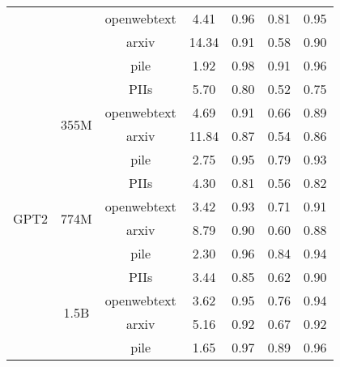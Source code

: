 \begin{table}[ht]
{\begin{tabular}{ccccccc}
\multicolumn{1}{c|}{}                        & \multicolumn{1}{c|}{}                      & openwebtext              & 4.41    & 0.96    & 0.81    & 0.95     \\
\multicolumn{1}{c|}{}                        & \multicolumn{1}{c|}{}                      & arxiv                    & 14.34   & 0.91    & 0.58    & 0.90     \\
\multicolumn{1}{c|}{}                        & \multicolumn{1}{c|}{}                      & pile                     & 1.92    & 0.98    & 0.91    & 0.96     \\ \hline
\multicolumn{1}{c|}{\multirow{12}{*}{GPT2}}  & \multicolumn{1}{c|}{\multirow{4}{*}{355M}} & PIIs                     & 5.70    & 0.80    & 0.52    & 0.75     \\
\multicolumn{1}{c|}{}                        & \multicolumn{1}{c|}{}                      & openwebtext              & 4.69    & 0.91    & 0.66    & 0.89     \\
\multicolumn{1}{c|}{}                        & \multicolumn{1}{c|}{}                      & arxiv                    & 11.84   & 0.87    & 0.54    & 0.86     \\
\multicolumn{1}{c|}{}                        & \multicolumn{1}{c|}{}                      & pile                     & 2.75    & 0.95    & 0.79    & 0.93     \\ \cline{2-7} 
\multicolumn{1}{c|}{}                        & \multicolumn{1}{c|}{\multirow{4}{*}{774M}} & PIIs                     & 4.30    & 0.81    & 0.56    & 0.82     \\
\multicolumn{1}{c|}{}                        & \multicolumn{1}{c|}{}                      & openwebtext              & 3.42    & 0.93    & 0.71    & 0.91     \\
\multicolumn{1}{c|}{}                        & \multicolumn{1}{c|}{}                      & arxiv                    & 8.79    & 0.90    & 0.60    & 0.88     \\
\multicolumn{1}{c|}{}                        & \multicolumn{1}{c|}{}                      & pile                     & 2.30    & 0.96    & 0.84    & 0.94     \\ \cline{2-7} 
\multicolumn{1}{c|}{}                        & \multicolumn{1}{c|}{\multirow{4}{*}{1.5B}} & PIIs                     & 3.44    & 0.85    & 0.62    & 0.90     \\
\multicolumn{1}{c|}{}                        & \multicolumn{1}{c|}{}                      & openwebtext              & 3.62    & 0.95    & 0.76    & 0.94     \\
\multicolumn{1}{c|}{}                        & \multicolumn{1}{c|}{}                      & arxiv                    & 5.16    & 0.92    & 0.67    & 0.92     \\
\multicolumn{1}{c|}{}                        & \multicolumn{1}{c|}{}                      & pile                     & 1.65    & 0.97    & 0.89    & 0.96     \\ \bottomrule[1.5pt]
\end{tabular}
}
\vspace{-1em}
\end{table}